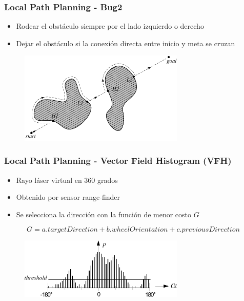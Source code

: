 \begin{frame}
	\frametitle{Local Path Planning - Bug2}
	
	\begin{itemize}
		\item Rodear el obstáculo siempre por el lado izquierdo o derecho
		\item Dejar el obstáculo si la conexión directa entre inicio y meta se cruzan
	\end{itemize}
	
	\begin{figure}
		\includegraphics[width=0.7\textwidth]{images/bug2.pdf}
	\end{figure}
	
\end{frame}

\begin{frame}
	\frametitle{Local Path Planning - Vector Field Histogram (VFH)}
	
	\begin{itemize}
		\item Rayo láser virtual en 360 grados
		\item Obtenido por sensor range-finder
		\item Se selecciona la dirección con la función de menor costo $G$
	\end{itemize}

	\begin{equation*}
		G = a.targetDirection + b.wheelOrientation + c.previousDirection
	\end{equation*}
	
	\begin{figure}
		\includegraphics[width=0.7\textwidth]{images/obstacle_avoidande_plor_histogram.pdf}
	\end{figure}
	
\end{frame}

